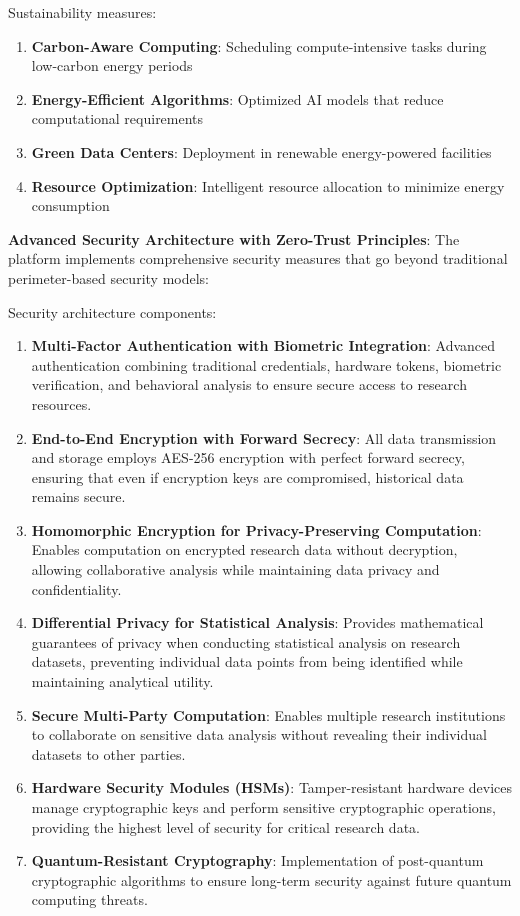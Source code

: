\documentclass[10pt,twocolumn]{article}
\begin{document}
Sustainability measures:
\begin{enumerate}
    \item \textbf{Carbon-Aware Computing}: Scheduling compute-intensive tasks during low-carbon energy periods
    \item \textbf{Energy-Efficient Algorithms}: Optimized AI models that reduce computational requirements
    \item \textbf{Green Data Centers}: Deployment in renewable energy-powered facilities
    \item \textbf{Resource Optimization}: Intelligent resource allocation to minimize energy consumption
\end{enumerate}

\textbf{Advanced Security Architecture with Zero-Trust Principles}: The platform implements comprehensive security measures that go beyond traditional perimeter-based security models:

Security architecture components:
\begin{enumerate}
    \item \textbf{Multi-Factor Authentication with Biometric Integration}: Advanced authentication combining traditional credentials, hardware tokens, biometric verification, and behavioral analysis to ensure secure access to research resources.
    
    \item \textbf{End-to-End Encryption with Forward Secrecy}: All data transmission and storage employs AES-256 encryption with perfect forward secrecy, ensuring that even if encryption keys are compromised, historical data remains secure.
    
    \item \textbf{Homomorphic Encryption for Privacy-Preserving Computation}: Enables computation on encrypted research data without decryption, allowing collaborative analysis while maintaining data privacy and confidentiality.
    
    \item \textbf{Differential Privacy for Statistical Analysis}: Provides mathematical guarantees of privacy when conducting statistical analysis on research datasets, preventing individual data points from being identified while maintaining analytical utility.
    
    \item \textbf{Secure Multi-Party Computation}: Enables multiple research institutions to collaborate on sensitive data analysis without revealing their individual datasets to other parties.
    
    \item \textbf{Hardware Security Modules (HSMs)}: Tamper-resistant hardware devices manage cryptographic keys and perform sensitive cryptographic operations, providing the highest level of security for critical research data.
    
    \item \textbf{Quantum-Resistant Cryptography}: Implementation of post-quantum cryptographic algorithms to ensure long-term security against future quantum computing threats.
\end{enumerate}
\end{document}
